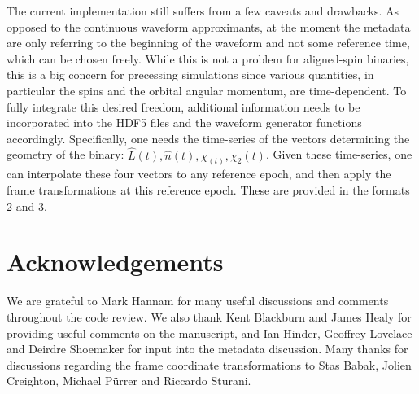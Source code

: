 \documentclass[11pt,tightenlines,article,amssymb,amsmath,amsfonts,superscriptaddress,nofootinbib]{revtex4}
\newcommand{\harald}[1]{\textcolor{Cerulean}{#1}}
\newcommand{\nNR}{\hat{n}}
\newcommand{\lNR}{\hat L}
\begin{document}
The current implementation still suffers from a few caveats and drawbacks. As opposed to the continuous waveform approximants, at the moment the metadata are only referring to the beginning of the waveform and not some reference time, which can be chosen freely. While this is not a problem for aligned-spin binaries, this is a big concern for precessing simulations since various quantities, in particular the spins and the orbital angular momentum, are time-dependent. To fully integrate this desired freedom, additional information needs to be incorporated into the HDF5 files and the waveform generator functions accordingly. Specifically, one needs the time-series of the vectors determining the geometry of the binary: $\lNR(t), \nNR(t), \chi_(t), \chi_2(t)$.  Given these time-series, one can interpolate these four vectors to any reference epoch, and then apply the frame transformations at this reference epoch. These are provided in the formats 2 and 3.

\section*{Acknowledgements}
We are grateful to Mark Hannam for many useful discussions and comments throughout the code review.
We also thank Kent Blackburn and James Healy for providing useful comments on the manuscript, and \harald{Ian Hinder}, Geoffrey Lovelace and Deirdre Shoemaker for input into the metadata discussion.
Many thanks for discussions regarding the frame coordinate transformations to Stas Babak, Jolien Creighton, Michael P\"urrer and Riccardo Sturani.




\end{document}

